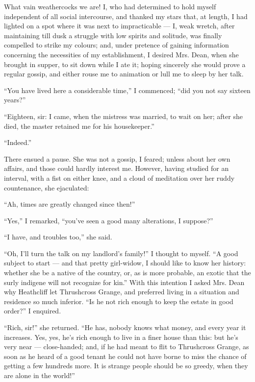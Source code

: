 \par What vain weathercocks we are! I, who had determined to hold myself independent of all social intercourse, and thanked my stars that, at length, I had lighted on a spot where it was next to impracticable — I, weak wretch, after maintaining till dusk a struggle with low spirits and solitude, was finally compelled to strike my colours; and, under pretence of gaining information concerning the necessities of my establishment, I desired Mrs. Dean, when she brought in supper, to sit down while I ate it; hoping sincerely she would prove a regular gossip, and either rouse me to animation or lull me to sleep by her talk.
\par “You have lived here a considerable time,” I commenced; “did you not say sixteen years?”
\par “Eighteen, sir: I came, when the mistress was married, to wait on her; after she died, the master retained me for his housekeeper.”
\par “Indeed.”
\par There ensued a pause. She was not a gossip, I feared; unless about her own affairs, and those could hardly interest me. However, having studied for an interval, with a fist on either knee, and a cloud of meditation over her ruddy countenance, she ejaculated:
\par “Ah, times are greatly changed since then!”
\par “Yes,” I remarked, “you've seen a good many alterations, I suppose?”
\par “I have, and troubles too,” she said.
\par “Oh, I'll turn the talk on my landlord's family!” I thought to myself. “A good subject to start — and that pretty girl-widow, I should like to know her history: whether she be a native of the country, or, as is more probable, an exotic that the surly indigene will not recognize for kin.” With this intention I asked Mrs. Dean why Heathcliff let Thrushcross Grange, and preferred living in a situation and residence so much inferior. “Is he not rich enough to keep the estate in good order?” I enquired.
\par “Rich, sir!” she returned. “He has, nobody knows what money, and every year it increases. Yes, yes, he's rich enough to live in a finer house than this: but he's very near — close-handed; and, if he had meant to flit to Thrushcross Grange, as soon as he heard of a good tenant he could not have borne to miss the chance of getting a few hundreds more. It is strange people should be so greedy, when they are alone in the world!”
